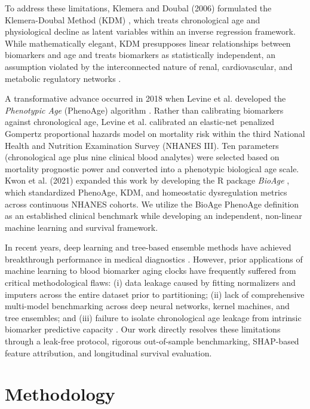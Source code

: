 \documentclass[conference]{IEEEtran}
\begin{document}
To address these limitations, Klemera and Doubal (2006) formulated the Klemera-Doubal Method (KDM) \cite{klemera2006new}, which treats chronological age and physiological decline as latent variables within an inverse regression framework. While mathematically elegant, KDM presupposes linear relationships between biomarkers and age and treats biomarkers as statistically independent, an assumption violated by the interconnected nature of renal, cardiovascular, and metabolic regulatory networks \cite{cohen2015statistical}.

A transformative advance occurred in 2018 when Levine et al. developed the \textit{Phenotypic Age} (PhenoAge) algorithm \cite{levine2018epigenetic}. Rather than calibrating biomarkers against chronological age, Levine et al. calibrated an elastic-net penalized Gompertz proportional hazards model on mortality risk within the third National Health and Nutrition Examination Survey (NHANES III). Ten parameters (chronological age plus nine clinical blood analytes) were selected based on mortality prognostic power and converted into a phenotypic biological age scale. Kwon et al. (2021) expanded this work by developing the R package \textit{BioAge} \cite{kwon2021bioage}, which standardized PhenoAge, KDM, and homeostatic dysregulation metrics across continuous NHANES cohorts. We utilize the BioAge PhenoAge definition as an established clinical benchmark while developing an independent, non-linear machine learning and survival framework.

In recent years, deep learning and tree-based ensemble methods have achieved breakthrough performance in medical diagnostics \cite{chen2016xgboost, lundberg2017unified}. However, prior applications of machine learning to blood biomarker aging clocks have frequently suffered from critical methodological flaws: (i) data leakage caused by fitting normalizers and imputers across the entire dataset prior to partitioning; (ii) lack of comprehensive multi-model benchmarking across deep neural networks, kernel machines, and tree ensembles; and (iii) failure to isolate chronological age leakage from intrinsic biomarker predictive capacity \cite{pyrkov2018quantitative}. Our work directly resolves these limitations through a leak-free protocol, rigorous out-of-sample benchmarking, SHAP-based feature attribution, and longitudinal survival evaluation.

\section{Methodology}
\end{document}
